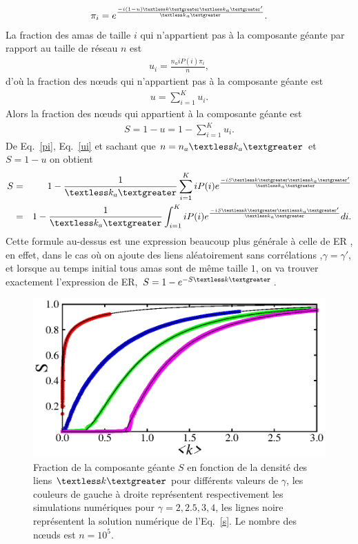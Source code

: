 \begin{eqnarray}
\pi_{i}=e^{\frac{-i(1-u)\km\kma'}{\kma}}.
\label{pi}
\end{eqnarray}
La fraction des amas de taille $i$ qui n'appartient pas à la composante géante par rapport au taille de réseau $n$ est 
\begin{eqnarray}
u_{i}=\frac{n_aiP(i)\pi_i}{n},
\label{ui}
\end{eqnarray}
d'où la fraction des nœuds qui  n'appartient pas  à la composante géante est
\begin{eqnarray}
u=\sum_{i=1}^K u_i.
\end{eqnarray}
Alors la fraction des nœuds qui appartient à la composante géante est 
\begin{eqnarray}
S=1-u=1-\sum_{i=1}^K u_i.
\end{eqnarray}
De Eq.~\ref{pi}, Eq.~\ref{ui} et sachant que $n=n_a\kma$ et $S=1-u$ on obtient
\begin{eqnarray}
S&=&1-\frac{1}{\kma}\sum_{i=1}^KiP(i)e^{\frac{-iS\km\kma'}{\kma}}\nonumber \\
&=& 1-\frac{1}{\kma}\int_{i=1}^KiP(i)e^{\frac{-iS\km\kma'}{\kma}}di.
\label{s}
\end{eqnarray}
 Cette formule au-dessus est une expression beaucoup plus générale à celle de ER \cite{Erdos-Renyi1959}, en effet, dans le cas où on ajoute des liens aléatoirement sans corrélations ,$\gamma=\gamma'$, et lorsque au temps initial tous amas sont de même taille $1$, on va trouver exactement l'expression de ER, $S=1-e^{-S\km}$.
  \begin{figure}[h!]
  	\centering
  	\includegraphics[scale=1.2]{./figures/fig-CG}
  	\caption{Fraction de la composante géante $S$ en fonction de la densité des liens $\km$ pour différents valeurs de $\gamma$, les couleurs de gauche à droite représentent  respectivement les simulations numériques pour $\gamma=2,2.5,3,4$, les lignes noire représentent la solution numérique de l'Eq.~\ref{s}. Le nombre des nœuds est $n=10^5$.}
  	\label{CG}
  \end{figure}
 
